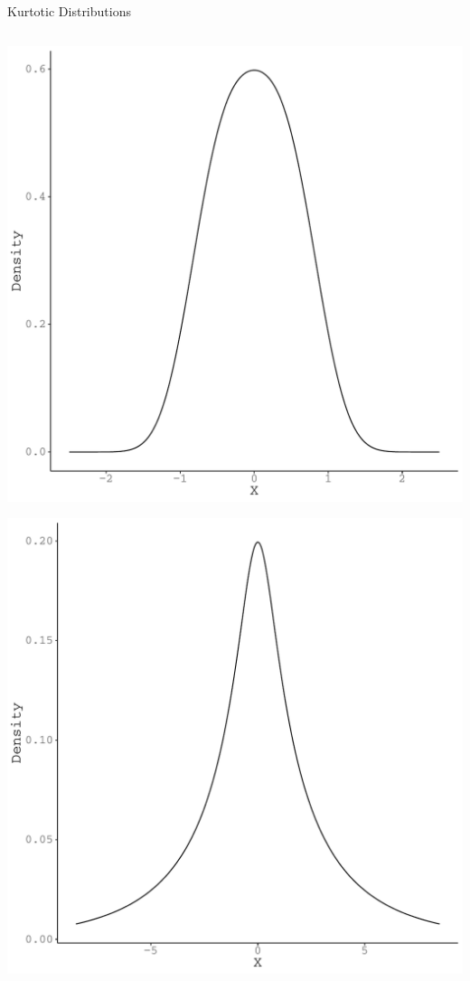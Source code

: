 \documentclass{beamer}\usepackage[]{graphicx}\usepackage[]{color}
\newenvironment{knitrout}{}{} %
\begin{document}
\begin{frame}{Kurtotic Distributions}
\begin{columns}
\begin{column}{0.5\textwidth}
\begin{knitrout}
{\centering \includegraphics[width=0.6\linewidth]{figure/unnamed-chunk-27-1} 

}




{\centering \includegraphics[width=0.6\linewidth]{figure/unnamed-chunk-27-2} 

}



\end{knitrout}

\end{column}
\end{columns}
  
\end{frame}

\watermarkon %
\end{document}
